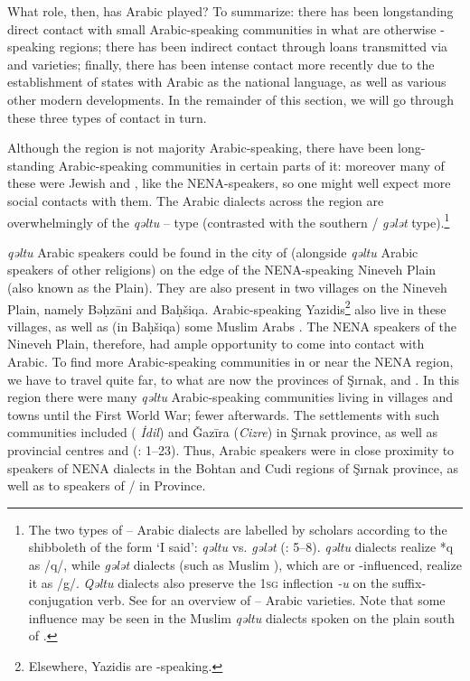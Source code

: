 \documentclass[output=paper]{langsci/langscibook}
\begin{document}
What role, then, has Arabic played? To summarize: there has been longstanding direct contact with small Arabic-speaking communities in what are otherwise -speaking regions; there has been indirect contact through loans transmitted via  and  varieties; finally, there has been intense contact more recently due to the establishment of states with Arabic as the national language, as well as various other modern developments. In the remainder of this section, we will go through these three types of contact in turn.

Although the region is not majority Arabic-speaking, there have been long-standing Arabic-speaking communities in certain parts of it: moreover many of these were Jewish and , like the NENA-speakers, so one might well expect more social contacts with them. The Arabic dialects across the region are overwhelmingly of the \textit{qəltu} – type (contrasted with the southern / \textit{gələt} type).\footnote{The two types of – Arabic dialects are labelled by scholars according to the shibboleth of the form ‘I said’: \textit{qəltu} vs. \textit{gələt} (\citealt{Blanc1964}: 5–8). \textit{qəltu} dialects realize *q as /q/, while \textit{gələt} dialects (such as Muslim ), which are  or -influenced, realize it as /g/. \textit{Qəltu} dialects also preserve the 1\textsc{sg} {inflection} \textit{-u} on the suffix-conjugation verb. See \citet{Talay2011} for an overview of -- Arabic varieties. Note that some  influence may be seen in the Muslim \textit{qəltu} dialects spoken on the plain south of  \citep[30]{Jastrow1978}.}

 \textit{qəltu} Arabic speakers could be found in the city of  (alongside \textit{qəltu} Arabic speakers of other religions) on the edge of the NENA-speaking Nineveh Plain (also known as the  Plain). They are also present in two villages on the Nineveh Plain, namely Bəḥzāni and Baḥšiqa. Arabic-speaking Yazidis\footnote{Elsewhere, Yazidis are -speaking.} also live in these villages, as well as (in Baḥšiqa) some Muslim Arabs \citep[24]{Jastrow1978}. The  NENA speakers of the Nineveh Plain, therefore, had ample opportunity to come into contact with Arabic. To find more  Arabic-speaking communities in or near the NENA region, we have to travel quite far, to what are now the  provinces of Şırnak,  and . In this region there were many  \textit{qəltu} Arabic-speaking communities living in villages and towns until the First World War; fewer afterwards. The settlements with such communities included  ( \textit{İdil}) and Ǧazīra (\textit{Cizre}) in Şırnak province, as well as provincial centres  and  (\citealt{Jastrow1978}: 1–23). Thus,  Arabic speakers were in close proximity to speakers of NENA dialects in the Bohtan and Cudi regions of Şırnak province, as well as to speakers of / in  Province.
\end{document}
